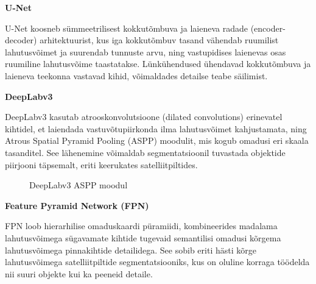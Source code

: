 \textbf{U-Net}

U-Net koosneb sümmeetrilisest kokkutõmbuva ja laieneva radade (encoder-decoder) arhitektuurist, kus iga kokkutõmbuv tasand vähendab ruumilist lahutusvõimet ja suurendab tunnuste arvu, ning vastupidises laienevas osas ruumiline lahutusvõime taastatakse. Lünkühendused ühendavad kokkutõmbuva ja laieneva teekonna vastavad kihid, võimaldades detailse teabe säilimist.



\textbf{DeepLabv3}

DeepLabv3 kasutab atrooskonvolutsioone (dilated convolutions) erinevatel kihtidel, et laiendada vastuvõtupiirkonda ilma lahutusvõimet kahjustamata, ning Atrous Spatial Pyramid Pooling (ASPP) moodulit, mis kogub omadusi eri skaala tasanditel. See lähenemine võimaldab segmentatsioonil tuvastada objektide piirjooni täpsemalt, eriti keerukates satelliitpiltides.

\begin{figure}[H]
    \centering
    \caption{DeepLabv3 ASPP moodul}
    \label{fig:DeepLabv3ASPP}
\end{figure}


\textbf{Feature Pyramid Network (FPN)}

FPN loob hierarhilise omaduskaardi püramiidi, kombineerides madalama lahutusvõimega sügavamate kihtide tugevaid semantilisi omadusi kõrgema lahutusvõimega pinnakihtide detailidega. See sobib eriti hästi kõrge lahutusvõimega satelliitpiltide segmentatsiooniks, kus on oluline korraga töödelda nii suuri objekte kui ka peeneid detaile.

